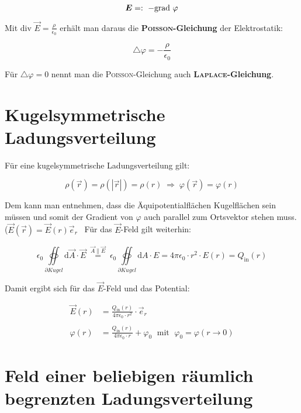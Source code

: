 \begin{equation*}
\bm{E} =: \ -\text{grad } \varphi
\end{equation*}

Mit div $\vec{E} = \frac{\rho}{\epsilon_0}$ erhält man daraus die \textbf{\textsc{Poisson}-Gleichung} der Elektrostatik:

\begin{equation*}
\bigtriangleup\varphi = - \frac{\rho}{\epsilon_0}
\end{equation*}

Für $\bigtriangleup\varphi = 0$ nennt man die \textsc{Poisson}-Gleichung auch \textbf{\textsc{Laplace}-Gleichung}.

\section{Kugelsymmetrische Ladungsverteilung}

Für eine kugelsymmetrische Ladungsverteilung gilt:

\begin{equation*}
\rho(\vec{r}) = \rho(|\vec{r}|) = \rho(r) \; \Rightarrow \; \varphi(\vec{r}) = \varphi(r)
\end{equation*}

Dem kann man entnehmen, dass die Äquipotentialflächen Kugelflächen sein müssen und somit der Gradient von $\varphi$ auch parallel zum Ortsvektor stehen muss.($\vec{E}(\vec{r}) = \vec{E}(r)\vec{e}_r$ \
Für das $\vec{E}$-Feld gilt weiterhin:

\begin{equation*}
\epsilon_0\oiint\limits_{\partial Kugel}\mathrm{d}\vec{A}\cdot\vec{E} \; \overset{\vec{A}\parallel\vec{E}}{=} \; \epsilon_0\oiint\limits_{\partial Kugel}\mathrm{d} A \cdot E = 4\pi\epsilon_0\cdot r^2 \cdot E(r) = Q_{\mathrm{in}}(r)
\end{equation*}

Damit ergibt sich für das $\vec{E}$-Feld und das Potential:

\begin{align*}
\vec{E}(r) &= \frac{Q_{\mathrm{in}}(r)}{4\pi\epsilon_0\cdot r^2} \cdot \vec{e}_r\\
\ \\
\varphi(r) &= \frac{Q_{\mathrm{in}}(r)}{4\pi\epsilon_0\cdot r} + \varphi_0 \; \text{ mit } \; \varphi_0 = \varphi(r \rightarrow 0)
\end{align*}

\section{Feld einer beliebigen räumlich begrenzten Ladungsverteilung}

